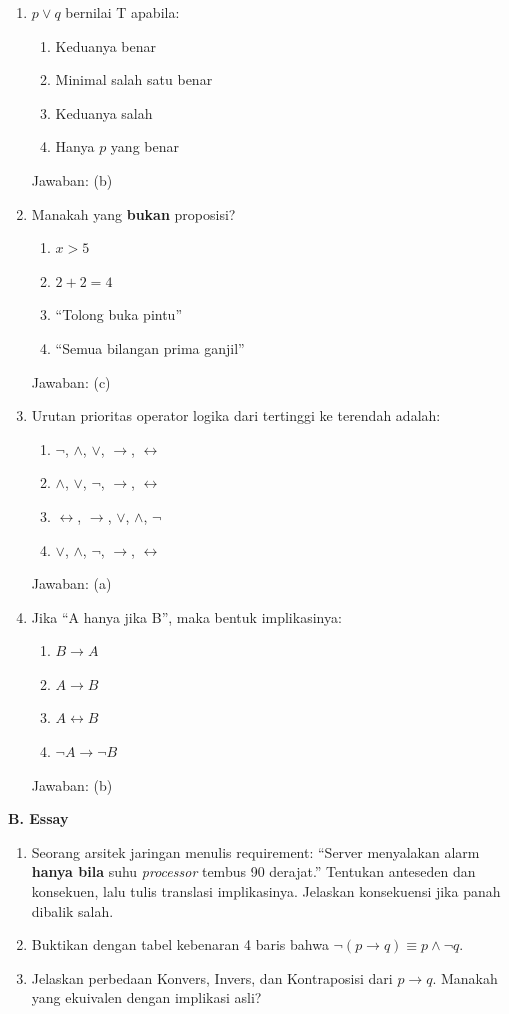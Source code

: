 \documentclass[../main]{subfiles}
\begin{document}
\begin{asesmen}
\begin{enumerate}
  \item $p \vee q$ bernilai T apabila:
  \begin{enumerate}
    \item Keduanya benar
    \item Minimal salah satu benar
    \item Keduanya salah
    \item Hanya $p$ yang benar
  \end{enumerate}
  Jawaban: (b)

  \item Manakah yang \textbf{bukan} proposisi?
  \begin{enumerate}
    \item $x > 5$
    \item $2 + 2 = 4$
    \item ``Tolong buka pintu''
    \item ``Semua bilangan prima ganjil''
  \end{enumerate}
  Jawaban: (c)

  \item Urutan prioritas operator logika dari tertinggi ke terendah adalah:
  \begin{enumerate}
    \item $\neg$, $\wedge$, $\vee$, $\rightarrow$, $\leftrightarrow$
    \item $\wedge$, $\vee$, $\neg$, $\rightarrow$, $\leftrightarrow$
    \item $\leftrightarrow$, $\rightarrow$, $\vee$, $\wedge$, $\neg$
    \item $\vee$, $\wedge$, $\neg$, $\rightarrow$, $\leftrightarrow$
  \end{enumerate}
  Jawaban: (a)

  \item Jika ``A hanya jika B'', maka bentuk implikasinya:
  \begin{enumerate}
    \item $B \rightarrow A$
    \item $A \rightarrow B$
    \item $A \leftrightarrow B$
    \item $\neg A \rightarrow \neg B$
  \end{enumerate}
  Jawaban: (b)
\end{enumerate}

\textbf{B. Essay}

\begin{enumerate}
  \item Seorang arsitek jaringan menulis requirement: ``Server menyalakan alarm \textbf{hanya bila} suhu \textit{processor} tembus 90 derajat.'' Tentukan anteseden dan konsekuen, lalu tulis translasi implikasinya. Jelaskan konsekuensi jika panah dibalik salah.
  \item Buktikan dengan tabel kebenaran 4 baris bahwa $\neg(p \rightarrow q) \equiv p \wedge \neg q$.
  \item Jelaskan perbedaan Konvers, Invers, dan Kontraposisi dari $p \rightarrow q$. Manakah yang ekuivalen dengan implikasi asli?
\end{enumerate}


\end{asesmen}
\end{document}
